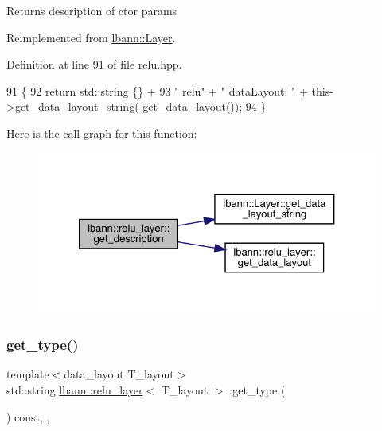 Returns description of ctor params 

Reimplemented from \hyperlink{classlbann_1_1Layer_acc0803d3428914ca1eb5988c4309174a}{lbann\+::\+Layer}.



Definition at line 91 of file relu.\+hpp.


\begin{DoxyCode}
91                                              \{
92     \textcolor{keywordflow}{return} std::string \{\} +
93      \textcolor{stringliteral}{" relu"} + \textcolor{stringliteral}{" dataLayout: "} + this->\hyperlink{classlbann_1_1Layer_ae3f4a5602df821f4221614b1e3782dc1}{get\_data\_layout\_string}(
      \hyperlink{classlbann_1_1relu__layer_a1d0b9cb9fc976c2c4375d9422a1ac112}{get\_data\_layout}());
94   \}
\end{DoxyCode}
Here is the call graph for this function\+:\nopagebreak
\begin{figure}[H]
\begin{center}
\leavevmode
\includegraphics[width=327pt]{classlbann_1_1relu__layer_a57d00fb2f9c90f5132ddea44d3ccc099_cgraph}
\end{center}
\end{figure}
\mbox{\label{classlbann_1_1relu__layer_afcf519aa5e19169c2b7a71aa0ee16aae}} 
\subsubsection{\texorpdfstring{get\+\_\+type()}{get\_type()}}
{\footnotesize\ttfamily template$<$data\+\_\+layout T\+\_\+layout$>$ \\
std\+::string \hyperlink{classlbann_1_1relu__layer}{lbann\+::relu\+\_\+layer}$<$ T\+\_\+layout $>$\+::get\+\_\+type (\begin{DoxyParamCaption}{ }\end{DoxyParamCaption}) const\hspace{0.3cm}{\ttfamily [inline]}, {\ttfamily [override]}, {\ttfamily [virtual]}}

